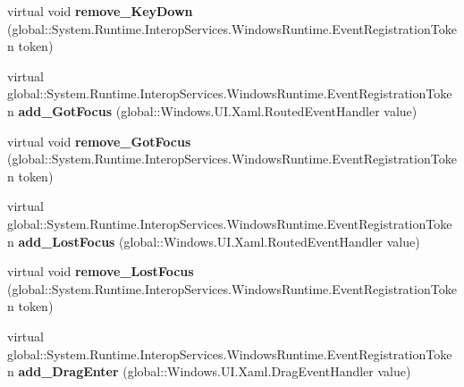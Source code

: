 \begin{DoxyCompactItemize}
\item 
\mbox{\label{class_windows_1_1_u_i_1_1_xaml_1_1_u_i_element_a20e6427c1bb47624dae8e067c2fcf806}} 
virtual void {\bfseries remove\+\_\+\+Key\+Down} (global\+::\+System.\+Runtime.\+Interop\+Services.\+Windows\+Runtime.\+Event\+Registration\+Token token)
\item 
\mbox{\label{class_windows_1_1_u_i_1_1_xaml_1_1_u_i_element_acf97b246d988b08971b2521c2500b00b}} 
virtual global\+::\+System.\+Runtime.\+Interop\+Services.\+Windows\+Runtime.\+Event\+Registration\+Token {\bfseries add\+\_\+\+Got\+Focus} (global\+::\+Windows.\+U\+I.\+Xaml.\+Routed\+Event\+Handler value)
\item 
\mbox{\label{class_windows_1_1_u_i_1_1_xaml_1_1_u_i_element_a969ce3d1998e0289e2292ad1e208096f}} 
virtual void {\bfseries remove\+\_\+\+Got\+Focus} (global\+::\+System.\+Runtime.\+Interop\+Services.\+Windows\+Runtime.\+Event\+Registration\+Token token)
\item 
\mbox{\label{class_windows_1_1_u_i_1_1_xaml_1_1_u_i_element_ac2967b5f0d4bd33c16e3b3b32e19b01a}} 
virtual global\+::\+System.\+Runtime.\+Interop\+Services.\+Windows\+Runtime.\+Event\+Registration\+Token {\bfseries add\+\_\+\+Lost\+Focus} (global\+::\+Windows.\+U\+I.\+Xaml.\+Routed\+Event\+Handler value)
\item 
\mbox{\label{class_windows_1_1_u_i_1_1_xaml_1_1_u_i_element_aea3d40de4ee0bc713def8655f7f7ccd3}} 
virtual void {\bfseries remove\+\_\+\+Lost\+Focus} (global\+::\+System.\+Runtime.\+Interop\+Services.\+Windows\+Runtime.\+Event\+Registration\+Token token)
\item 
\mbox{\label{class_windows_1_1_u_i_1_1_xaml_1_1_u_i_element_a84e265c30f9ba7acab529bdfc0475eb7}} 
virtual global\+::\+System.\+Runtime.\+Interop\+Services.\+Windows\+Runtime.\+Event\+Registration\+Token {\bfseries add\+\_\+\+Drag\+Enter} (global\+::\+Windows.\+U\+I.\+Xaml.\+Drag\+Event\+Handler value)
\item 
\mbox{\label{class_windows_1_1_u_i_1_1_xaml_1_1_u_i_element_ab1b0c333cb61061297f04ff3341ed26d}} 

\end{DoxyCompactItemize}
